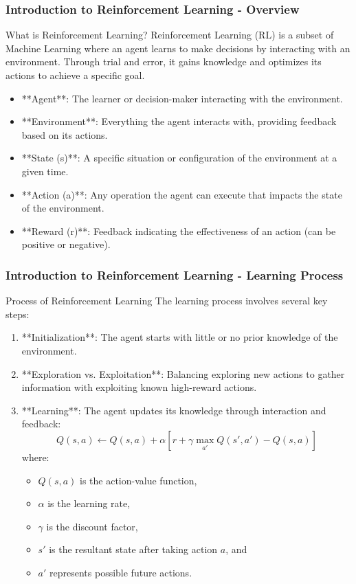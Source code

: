 \documentclass[aspectratio=169]{beamer}
\begin{document}
\frame{\titlepage}

\begin{frame}[fragile]
    \frametitle{Introduction to Reinforcement Learning - Overview}
    \begin{block}{What is Reinforcement Learning?}
        Reinforcement Learning (RL) is a subset of Machine Learning where an agent learns to make decisions by interacting with an environment.
        Through trial and error, it gains knowledge and optimizes its actions to achieve a specific goal.
    \end{block}
    
    \begin{itemize}
        \item **Agent**: The learner or decision-maker interacting with the environment.
        \item **Environment**: Everything the agent interacts with, providing feedback based on its actions.
        \item **State (s)**: A specific situation or configuration of the environment at a given time.
        \item **Action (a)**: Any operation the agent can execute that impacts the state of the environment.
        \item **Reward (r)**: Feedback indicating the effectiveness of an action (can be positive or negative).
    \end{itemize}
\end{frame}

\begin{frame}[fragile]
    \frametitle{Introduction to Reinforcement Learning - Learning Process}
    \begin{block}{Process of Reinforcement Learning}
        The learning process involves several key steps:
    \end{block}
    \begin{enumerate}
        \item **Initialization**: The agent starts with little or no prior knowledge of the environment.
        \item **Exploration vs. Exploitation**: Balancing exploring new actions to gather information with exploiting known high-reward actions.
        \item **Learning**: The agent updates its knowledge through interaction and feedback:
        \[
        Q(s, a) \leftarrow Q(s, a) + \alpha [r + \gamma \max_{a'} Q(s', a') - Q(s, a)]
        \]
        where:
        \begin{itemize}
            \item \(Q(s, a)\) is the action-value function,
            \item \(\alpha\) is the learning rate,
            \item \(\gamma\) is the discount factor,
            \item \(s'\) is the resultant state after taking action \(a\), and
            \item \(a'\) represents possible future actions.
        \end{itemize}
    \end{enumerate}
\end{frame}
\end{document}
